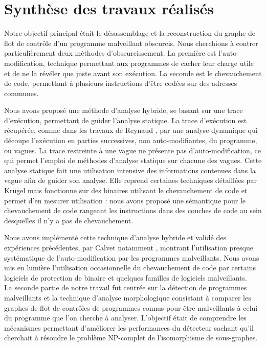 \section*{Synthèse des travaux réalisés}

Notre objectif principal était le désassemblage et la reconstruction du graphe de flot de contrôle d'un programme malveillant obscurcis.
Nous cherchions à contrer particulièrement deux méthodes d'obscurcissement. 
La première est l'auto-modification, technique permettant aux programmes de cacher leur charge utile et de ne la révéler que juste avant son exécution. La seconde est le chevauchement de code, permettant à plusieurs instructions d'être codées sur des adresses communes.

Nous avons proposé une méthode d'analyse hybride, se basant sur une trace d'exécution, permettant de guider l'analyse statique.
La trace d'exécution est récupérée, comme dans les travaux de Reynaud \cite{Reynaud2010}, par une analyse dynamique qui découpe l'exécution en parties successives, non auto-modifiantes, du programme, ou vagues.
La trace restreinte à une vague ne présente pas d'auto-modification, ce qui permet l'emploi de méthodes d'analyse statique sur chacune des vagues.
Cette analyse statique fait une utilisation intensive des informations contenues dans la vague afin de guider son analyse.
Elle reprend certaines techniques détaillées par Krügel \cite{KruegelRVV04} mais fonctionne sur des binaires utilisant le chevauchement de code et permet d'en mesurer utilisation : nous avons proposé une sémantique pour le chevauchement de code rangeant les instructions dans des couches de code au sein desquelles il n'y a pas de chevauchement.

Nous avons implémenté cette technique d'analyse hybride et validé des expériences précédentes, par Calvet notamment \cite{Calvet2013}, montrant l'utilisation presque systématique de l'auto-modification par les programmes malveillants.
Nous avons mis en lumière l'utilisation occasionnelle du chevauchement de code par certains logiciels de protection de binaire et quelques familles de logiciels malveillants.
\\

La seconde partie de notre travail fut centrée sur la détection de programmes malveillants et la technique d'analyse morphologique \cite{BKM08} consistant à comparer les graphes de flot de contrôles de programmes connus pour être malveillants à celui du programme que l'on cherche à analyser.
L'objectif était de comprendre les mécanismes permettant d'améliorer les performances du détecteur sachant qu'il cherchait à résoudre le problème NP-complet de l'isomorphisme de sous-graphes.

